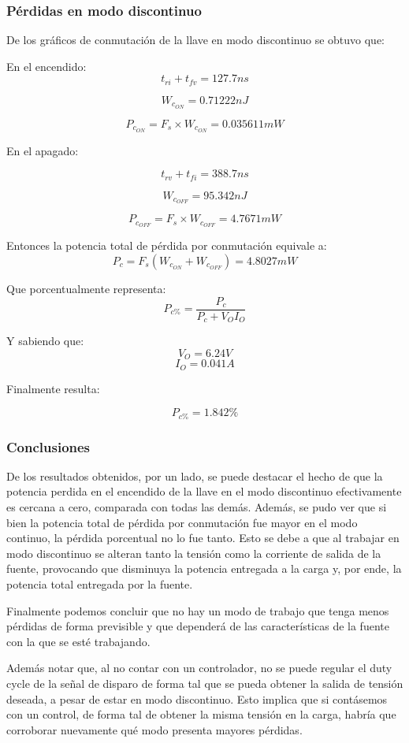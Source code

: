 \documentclass[e4_tp1_main.tex]{subfiles}
\begin{document}
	
	
	\subsubsection{Pérdidas en modo discontinuo}
	De los gráficos de conmutación de la llave en modo discontinuo se obtuvo que:
	
	En el encendido:
	\[t_{ri}+t_{fv}=127.7ns\]
	
	
	
	\[W_{c_{ON}}=0.71222nJ\]
	
	
	
	\[P_{c_{ON}}=F_s\times W_{c_{ON}}=0.035611mW\]
	
	
	En el apagado:
	
	\[t_{rv}+t_{fi}=388.7ns\]
	
	
	
	\[W_{c_{OFF}}=95.342nJ\]
	
	\[P_{c_{OFF}}=F_s\times W_{c_{OFF}}=4.7671mW\]
	
	Entonces la potencia total de pérdida por conmutación equivale a:
	\[P_c=F_s(W_{c_{ON}}+W_{c_{OFF}})=4.8027mW\]
	
	Que porcentualmente representa:
	\[P_{c\%}=\frac{P_c}{P_c+V_OI_O}\]
	
	Y sabiendo que:
	\[V_O=6.24V\]
	\[I_O=0.041A\]
	
	Finalmente resulta:
	
	\[P_{c\%}=1.842\%\]
	
	\subsubsection{Conclusiones}
	De los resultados obtenidos, por un lado, se puede destacar el hecho de que la potencia perdida en el encendido de la llave en el modo discontinuo  efectivamente es cercana a cero, comparada con todas las demás. Además, se pudo ver que si bien la potencia total de pérdida por conmutación fue mayor en el modo continuo, la pérdida porcentual no lo fue tanto. Esto se debe a que al trabajar en modo discontinuo se alteran tanto la tensión como la corriente de salida de la fuente, provocando que disminuya la potencia entregada a la carga y, por ende, la potencia total entregada por la fuente. 
	
	Finalmente podemos concluir que no hay un modo de trabajo que tenga menos pérdidas de forma previsible y que dependerá de las características de la fuente con la que se esté trabajando. 
	
	Además notar que, al no contar con un controlador, no se puede regular el duty cycle de la señal de disparo de forma tal que se pueda obtener la salida de tensión deseada, a pesar de estar en modo discontinuo. Esto implica que si contásemos con un control, de forma tal de obtener la misma tensión en la carga, habría que corroborar nuevamente qué modo presenta mayores pérdidas.
	
\end{document}
